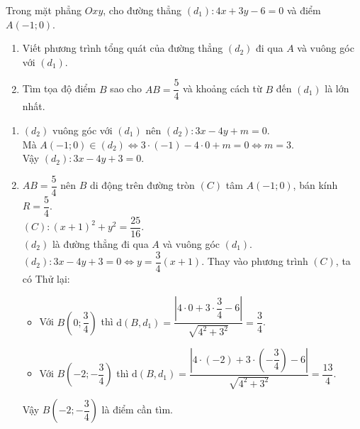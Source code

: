 \begin{bt}%
	Trong mặt phẳng $Oxy$, cho đường thẳng $(d_1)\colon 4x+3y-6=0$ và điểm $A(-1;0)$.
	\begin{enumerate}
		\item Viết phương trình tổng quát của đường thẳng $(d_2)$ đi qua $A$ và vuông góc với $(d_1)$.
		\item Tìm tọa độ điểm $B$ sao cho $AB=\dfrac{5}{4}$ và khoảng cách từ $B$ đến $(d_1)$ là lớn nhất.
	\end{enumerate}
\loigiai
{
\begin{enumerate}
	\item $(d_2)$ vuông góc với $(d_1)$ nên $(d_2) \colon 3x-4y+m=0$.\\
	Mà $A(-1;0) \in (d_2) \Leftrightarrow 3\cdot (-1)-4\cdot 0+m=0 \Leftrightarrow m=3$.\\
	Vậy $(d_2) \colon 3x-4y+3=0$.
	\item $AB=\dfrac{5}{4}$ nên $B$ di động trên đường tròn $(C)$ tâm $A(-1;0)$, bán kính $R=\dfrac{5}{4}$.\\
	$(C) \colon \left(x+1\right)^2+y^2=\dfrac{25}{16}$.\\
	$(d_2)$ là đường thẳng đi qua $A$ và vuông góc $(d_1)$.\\ $(d_2) \colon 3x-4y+3=0 \Leftrightarrow y=\dfrac{3}{4}\left(x+1\right)$. Thay vào phương trình $(C)$, ta có
	Thử lại:
	\begin{itemize}
		\item Với $B\left(0;\dfrac{3}{4}\right)$ thì $\mathrm{d}(B,d_1)=\dfrac{\left|4\cdot 0+3\cdot \dfrac{3}{4}-6\right|}{\sqrt{4^2+3^2}}=\dfrac{3}{4}$.
		\item Với $B\left(-2;-\dfrac{3}{4}\right)$ thì $\mathrm{d}(B,d_1)=\dfrac{\left|4\cdot (-2)+3\cdot \left(-\dfrac{3}{4}\right)-6\right|}{\sqrt{4^2+3^2}}=\dfrac{13}{4}$.
	\end{itemize}
Vậy $B\left(-2;-\dfrac{3}{4}\right)$ là điểm cần tìm.
\end{enumerate}	
}
\end{bt}
